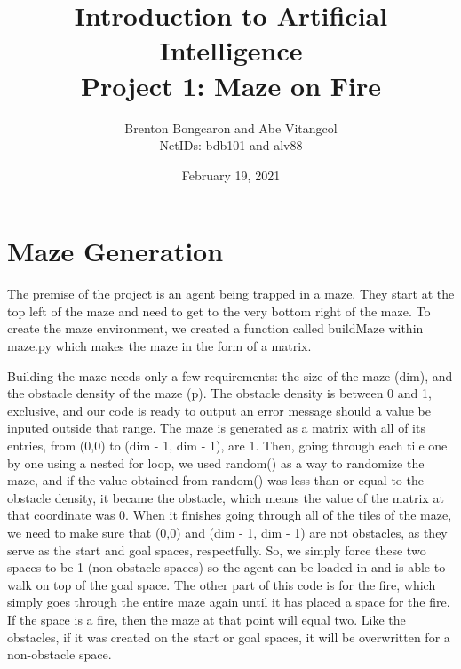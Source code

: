 \documentclass[11pt]{article}
\title{\textbf{Introduction to Artificial Intelligence\\
		\large Project 1: Maze on Fire}}
\author{Brenton Bongcaron and Abe Vitangcol\\NetIDs: bdb101 and alv88}
\date{February 19, 2021}
\begin{document}
	\maketitle
	\pagebreak
\section{Maze Generation}
The premise of the project is an agent being trapped in a maze. They start at the top left of the maze and need to get to the very bottom right of the maze. To create the maze environment, we created a function called buildMaze within maze.py which makes the maze in the form of a matrix.


Building the maze needs only a few requirements: the size of the maze (dim), and the obstacle density of the maze (p). The obstacle density is between 0 and 1, exclusive, and our code is ready to output an error message should a value be inputed outside that range. The maze is generated as a matrix with all of its entries, from (0,0) to (dim - 1, dim - 1), are 1. Then, going through each tile one by one using a nested for loop, we used random() as a way to randomize the maze, and if the value obtained from random() was less than or equal to the obstacle density, it became the obstacle, which means the value of the matrix at that coordinate was 0. When it finishes going through all of the tiles of the maze, we need to make sure that (0,0) and (dim - 1, dim - 1) are not obstacles, as they serve as the start and goal spaces, respectfully. So, we simply force these two spaces to be 1 (non-obstacle spaces) so the agent can be loaded in and is able to walk on top of the goal space.
The other part of this code is for the fire, which simply goes through the entire maze again until it has placed a space for the fire. If the space is a fire, then the maze at that point will equal two. Like the obstacles, if it was created on the start or goal spaces, it will be overwritten for a non-obstacle space.
	\pagebreak
\end{document}
